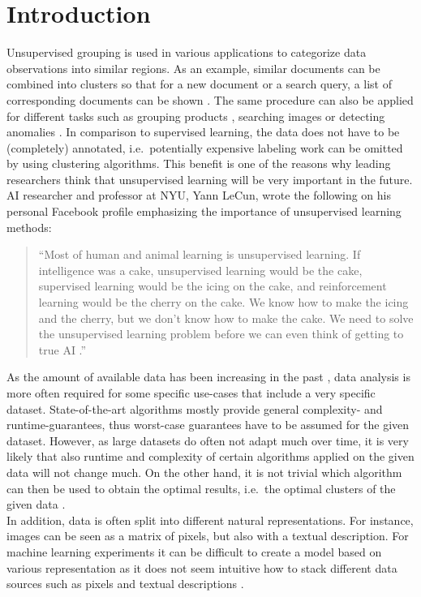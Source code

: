 \chapter{Introduction}


Unsupervised grouping is used in various applications to categorize data observations into similar regions. As an example, similar documents can be combined into clusters so that for a new document or a search query, a list of corresponding documents can be shown \cite{zamir1998web}. The same procedure can also be applied for different tasks such as grouping products \cite{balakrishnan2018product}, searching images \cite{lin2018dimensionality} or detecting anomalies \cite{he2003discovering}. In comparison to supervised learning, the data does not have to be (completely) annotated, i.e.\ potentially expensive labeling work can be omitted by using clustering algorithms. This benefit is one of the reasons why leading researchers think that unsupervised learning will be very important in the future. AI researcher and professor at NYU, Yann LeCun, wrote the following on his personal Facebook profile emphasizing the importance of unsupervised learning methods:

\blockquote{``Most of human and animal learning is unsupervised learning. If intelligence was a cake, unsupervised learning would be the cake, supervised learning would be the icing on the cake, and reinforcement learning would be the cherry on the cake. We know how to make the icing and the cherry, but we don’t know how to make the cake. We need to solve the unsupervised learning problem before we can even think of getting to true AI \cite{lecun}.''}

As the amount of available data has been increasing in the past \cite{wamba2015big}, data analysis is more often required for some specific use-cases that include a very specific dataset. State-of-the-art algorithms mostly provide general complexity- and runtime-guarantees, thus worst-case guarantees have to be assumed for the given dataset. However, as large datasets do often not adapt much over time, it is very likely that also runtime and complexity of certain algorithms applied on the given data will not change much. On the other hand, it is not trivial which algorithm can then be used to obtain the optimal results, i.e.\ the optimal clusters of the given data \cite{DBLP:journals/corr/GuptaR15b}.\\

In addition, data is often split into different natural representations. For instance, images can be seen as a matrix of pixels, but also with a textual description. For machine learning experiments it can be difficult to create a model based on various representation as it does not seem intuitive how to stack different data sources such as pixels and textual descriptions \cite{cebral2018combining}.\\

